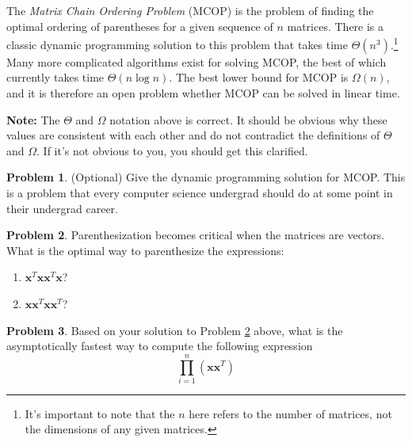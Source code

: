 \documentclass[10pt]{article}
\theoremstyle{definition}
\newtheorem{problem}{Problem}
\newcommand{\trans}[1]{{#1}^{T}}
\newcommand{\x}{\mathbf x}
\begin{document}
\newpage
The \emph{Matrix Chain Ordering Problem} (MCOP) is the problem of finding the optimal ordering of parentheses for a given sequence of $n$ matrices.
There is a classic dynamic programming solution to this problem that takes time $\Theta(n^3)$.\footnote{It's important to note that the $n$ here refers to the number of matrices, not the dimensions of any given matrices.}
Many more complicated algorithms exist for solving MCOP,
the best of which currently takes time $\Theta(n \log n)$.
The best lower bound for MCOP is $\Omega(n)$,
and it is therefore an open problem whether MCOP can be solved in linear time.

\textbf{Note:}
The $\Theta$ and $\Omega$ notation above is correct.
It should be obvious why these values are consistent with each other and do not contradict the definitions of $\Theta$ and $\Omega$.
If it's not obvious to you, you should get this clarified.

\begin{problem}
    (Optional)
    Give the dynamic programming solution for MCOP.
    This is a problem that every computer science undergrad should do at some point in their undergrad career.
\end{problem}

\begin{problem}
    \label{prob:8}
    Parenthesization becomes critical when the matrices are vectors.
    What is the optimal way to parenthesize the expressions:
    \begin{enumerate}
        \item
            $\trans \x \x \trans \x \x$?
            \vspace{3in}
        \item
            $\x \trans \x \x \trans \x$?
            \vspace{3in}
    \end{enumerate}
\end{problem}

\begin{problem}
    Based on your solution to Problem \ref{prob:8} above,
    what is the asymptotically fastest way to compute the following expression
    \begin{equation}
        \prod_{i=1}^n (\x \trans \x)
    \end{equation}
    \vspace{2in}
\end{problem}

\end{document}
